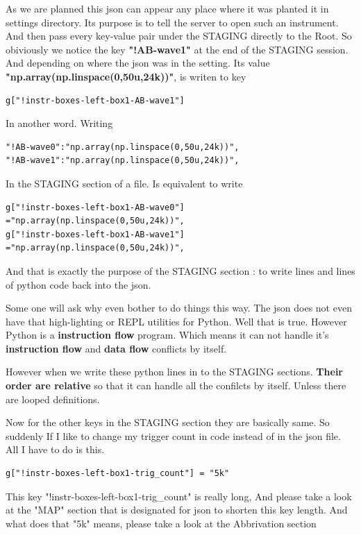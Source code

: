\documentclass{article}
\begin{document}
As we are planned this json can appear any
place where it was planted it in settings directory.
Its purpose is to tell the server to open such an instrument.
And then pass every key-value pair under the STAGING directly
	to the Root. 
So  obiviously we notice the key {\bf "!AB-wave1"} at the 
	end of the STAGING session. 
And depending on where the json was in the setting. Its value {\bf"np.array(np.linspace(0,50u,24k))"}, is writen to key

\begin{lstlisting}
g["!instr-boxes-left-box1-AB-wave1"]
\end{lstlisting}

In another word.
Writing
\begin{lstlisting}
"!AB-wave0":"np.array(np.linspace(0,50u,24k))",
"!AB-wave1":"np.array(np.linspace(0,50u,24k))",
\end{lstlisting}
In the STAGING section of a file.
Is equivalent to write 
\begin{lstlisting}
g["!instr-boxes-left-box1-AB-wave0"] ="np.array(np.linspace(0,50u,24k))",
g["!instr-boxes-left-box1-AB-wave1"] ="np.array(np.linspace(0,50u,24k))",
\end{lstlisting}
And that is exactly the purpose of the STAGING section : to write lines and lines of python code back into the json.

Some one will ask why even bother to do things this way.
The json does not even have that high-lighting 
	or REPL utilities for Python.
Well that is true. 
However Python is a {\bf instruction flow }  program.
Which means it can not handle it's {\bf instruction flow } 
	and {\bf data flow } conflicts by itself.

However when we write these python lines in to the STAGING sections.
{\bf Their order are relative } so that it can handle 
	all the confilcts by itself. Unless there are looped definitions.

Now for the other keys in the STAGING section they are basically same.
So suddenly If I like to change my trigger count in code instead of
	in the json file. 
All I have to do is this.
\begin{lstlisting}
g["!instr-boxes-left-box1-trig_count"] = "5k"
\end{lstlisting}

This key "!instr-boxes-left-box1-trig\_count"  is really long, And please
take a look at the "MAP" section that is designated for json to shorten
this key length. And what does that "5k" means, please take a look at the Abbrivation section
\end{document}
